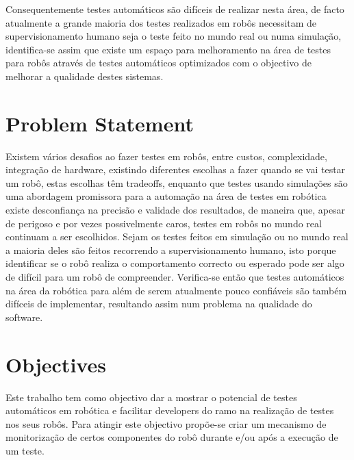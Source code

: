 
Consequentemente testes 
automáticos são difíceis de realizar nesta área, de facto atualmente a grande maioria dos testes 
realizados em robôs necessitam de supervisionamento humano seja o teste feito no mundo real ou numa 
simulação, identifica-se assim que existe um espaço para melhoramento na área de testes para robôs 
através de testes automáticos optimizados com o objectivo de melhorar a qualidade destes sistemas.

\section{Problem Statement}
\label{sec:problem}


Existem vários desafios ao fazer testes em robôs, entre custos, complexidade, integração de hardware, 
existindo diferentes escolhas a fazer quando se vai testar um robô, estas escolhas têm tradeoffs, 
enquanto que testes usando simulações são uma abordagem promissora para a automação na área de testes 
em robótica existe desconfiança na precisão e validade dos resultados, de maneira que, apesar de 
perigoso e por vezes possivelmente caros, testes em robôs no mundo real continuam a ser escolhidos. 
Sejam os testes feitos em simulação ou no mundo real a maioria deles são feitos recorrendo a 
supervisionamento humano, isto porque identificar se o robô realiza o comportamento correcto ou 
esperado pode ser algo de difícil para um robô de compreender. Verifica-se então que testes automáticos 
na área da robótica para além de serem atualmente pouco confiáveis são também difíceis de implementar, 
resultando assim num problema na qualidade do software.~\cite{TestRob} 

\section{Objectives}
\label{sec:objectives}

Este trabalho tem como objectivo dar a mostrar o potencial de testes automáticos em robótica e facilitar 
developers do ramo na realização de testes nos seus robôs. Para atingir este objectivo propõe-se criar 
um mecanismo de monitorização de certos componentes do robô durante e/ou após a execução de um teste. 


